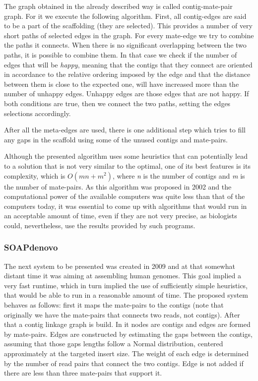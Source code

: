 \documentclass[11pt]{article}
\begin{document}
The graph obtained in the already described way is called contig-mate-pair
graph. For it we execute the following algorithm. First, all contig-edges are
said to be a part of the scaffolding (they are selected). This provides a number
of very short paths of selected edges in the graph. For every mate-edge we try
to combine the paths it connects. When there is no significant overlapping
between the two paths, it is possible to combine them. In that case we check if
the number of edges that will be \emph{happy}, meaning that the contigs that
they connect are oriented in accordance to the relative ordering imposed by the
edge and that the distance between them is close to the expected one, will have
increased more than the number of unhappy edges. Unhappy edges are those edges
that are not happy. If both conditions are true, then we connect the two paths,
setting the edges selections accordingly.

After all the meta-edges are used, there is one additional step which tries to
fill any gaps in the scaffold using some of the unused contigs and mate-pairs.

Although the presented algorithm uses some heuristics that can potentially lead
to a solution that is not very similar to the optimal, one of its best
features is its complexity, which is $O(m n + m ^ 2)$, where \emph{n} is
the number of contigs and \emph{m} is the number of mate-pairs. As this
algorithm was proposed in 2002 and the computational power of the available
computers was quite less than that of the computers today, it was essential to
come up with algorithms that would run in an acceptable amount of time, even if
they are not very precise, as biologists could, nevertheless, use the results
provided by such programs.

\subsubsection{SOAPdenovo} %
\label{ssub:SOAPdenovo}
The next system to be presented \cite{SOAPdenovo} was created in 2009 and at
that somewhat distant time it was aiming at assembling human genomes. This goal
implied a very fast runtime, which in turn implied the use of sufficiently
simple heuristics, that would be able to run in a reasonable amount of time. The
proposed system behaves as follows: first it maps the mate-pairs to the contigs
(note that originally we have the mate-pairs that connects two reads, not
contigs). After that a contig linkage graph is build. In it nodes are contigs
and edges are formed by mate-pairs. Edges are constructed by estimating the gaps
between the contigs, assuming that those gaps lengths follow a Normal
distribution, centered approximately at the targeted insert size. The weight of
each edge is determined by the number of read pairs that connect the two
contigs. Edge is not added if there are less than three mate-pairs that support
it.
\end{document}
